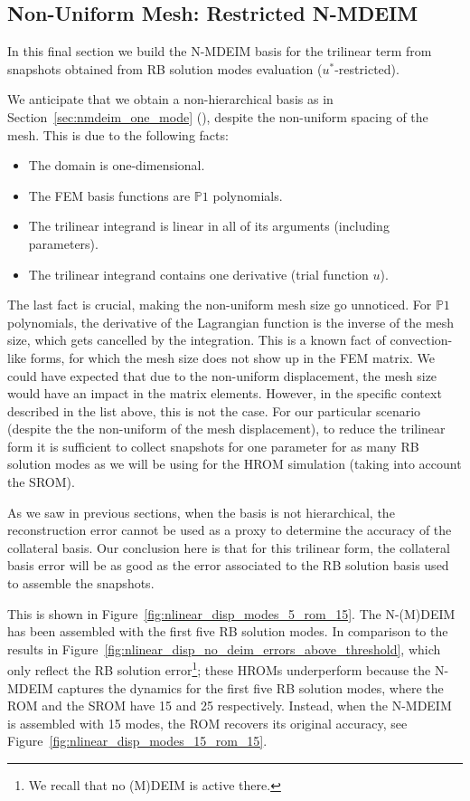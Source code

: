 \documentclass[../../thesis.tex]{subfiles}
\begin{document}
\clearpage
\subsection{Non-Uniform Mesh: Restricted N-MDEIM}
\label{sec:arbitrary_mesh_nmdeim_mode_evaluation}
In this final section we build the N-MDEIM basis for the trilinear term
from snapshots obtained from RB solution modes evaluation 
($u^{*}$-restricted).

We anticipate that we obtain a non-hierarchical basis as in
Section~\ref{sec:nmdeim_one_mode} 
(), 
despite the non-uniform spacing of the mesh.
This is due to the following facts:
\begin{itemize}
    \item The domain is one-dimensional.
    \item The FEM basis functions are $\mathbb{P}1$ polynomials.
    \item The trilinear integrand is linear in all of its arguments (including parameters).
    \item The trilinear integrand contains one derivative (trial function $u$).
\end{itemize}
The last fact is crucial, making the non-uniform mesh size go unnoticed.
For $\mathbb{P}1$ polynomials, the derivative of the Lagrangian function 
is the inverse of the mesh size, which gets cancelled by the integration.
This is a known fact of convection-like forms, 
for which the mesh size does not show up in the FEM matrix.
We could have expected that due to the non-uniform displacement,
the mesh size would have an impact in the matrix elements.
However, in the specific context described in the list above,
this is not the case.
For our particular scenario 
(despite the the non-uniform of the mesh displacement),
to reduce the trilinear form it is sufficient to collect snapshots for one parameter
for as many RB solution modes as we will be using for the HROM simulation
(taking into account the SROM). 

As we saw in previous sections, when the basis is not hierarchical, 
the reconstruction error cannot be used as a proxy to determine the accuracy of the collateral basis.
Our conclusion here is that for this trilinear form, 
the collateral basis error will be as good as the error associated 
to the RB solution basis used to assemble the snapshots.

This is shown in Figure~\ref{fig:nlinear_disp_modes_5_rom_15}.
The \mbox{N-(M)DEIM} has been assembled with the first five RB solution modes.
In comparison to the results in Figure~\ref{fig:nlinear_disp_no_deim_errors_above_threshold},
which only reflect the RB solution error\footnote
{
    We recall that no (M)DEIM is active there.
};
these HROMs underperform because the \mbox{N-MDEIM} captures the dynamics for the first five RB solution modes,
where the ROM and the SROM have 15 and 25 respectively.
Instead, when the \mbox{N-MDEIM} is assembled with 15 modes, the ROM recovers its original accuracy,
see Figure~\ref{fig:nlinear_disp_modes_15_rom_15}.
\end{document}
